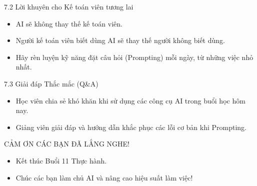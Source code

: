 \documentclass[aspectratio=169]{beamer}
\begin{document}
\begin{frame}{7.2 Lời khuyên cho Kế toán viên tương lai}
    \begin{itemize}
        \item AI sẽ không thay thế kế toán viên.
        \item Người kế toán viên biết dùng AI sẽ thay thế người không biết dùng.
        \item Hãy rèn luyện kỹ năng đặt câu hỏi (Prompting) mỗi ngày, từ những việc nhỏ nhất.
    \end{itemize}
\end{frame}


\begin{frame}{7.3 Giải đáp Thắc mắc (Q\&A)}
    \begin{itemize}
        \item Học viên chia sẻ khó khăn khi sử dụng các công cụ AI trong buổi học hôm nay.
        \item Giảng viên giải đáp và hướng dẫn khắc phục các lỗi cơ bản khi Prompting.
    \end{itemize}
\end{frame}


\begin{frame}{CẢM ƠN CÁC BẠN ĐÃ LẮNG NGHE!}
    \begin{itemize}
        \item Kết thúc Buổi 11 Thực hành.
        \item Chúc các bạn làm chủ AI và nâng cao hiệu suất làm việc!
    \end{itemize}
\end{frame}
\end{document}
